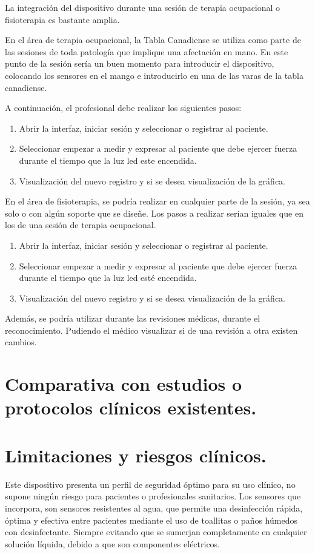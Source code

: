 La integración del dispositivo durante una sesión de terapia ocupacional o fisioterapia es bastante amplia.

En el área de terapia ocupacional, la Tabla Canadiense se utiliza como parte de las sesiones de toda patología que implique una afectación en mano. En este punto de la sesión sería un buen momento para introducir el dispositivo, colocando los sensores en el mango e introducirlo en una de las varas de la tabla canadiense. 

A continuación, el profesional debe realizar los siguientes pasos: 
\begin{enumerate}
    \item Abrir la interfaz, iniciar sesión y seleccionar o registrar al paciente.
    \item Seleccionar empezar a medir y expresar al paciente que debe ejercer fuerza durante el tiempo que la luz led este encendida.
    \item Visualización del nuevo registro y si se desea visualización de la gráfica. 
\end{enumerate}

En el área de fisioterapia, se podría realizar en cualquier parte de la sesión, ya sea solo o con algún soporte que se diseñe. Los pasos a realizar serían iguales que en los de una sesión de terapia ocupacional. 
\begin{enumerate}
    \item Abrir la interfaz, iniciar sesión y seleccionar o registrar al paciente.
    \item Seleccionar empezar a medir y expresar al paciente que debe ejercer fuerza durante el tiempo que la luz led esté encendida.
    \item Visualización del nuevo registro y si se desea visualización de la gráfica. 
\end{enumerate}

Además, se podría utilizar durante las revisiones médicas, durante el reconocimiento. Pudiendo el médico visualizar si de una revisión a otra existen cambios. 

\section{ Comparativa con estudios o protocolos clínicos existentes.}
\section{Limitaciones y riesgos clínicos.}
Este dispositivo presenta un perfil de seguridad óptimo para su uso clínico, no supone ningún riesgo para pacientes o profesionales sanitarios. Los sensores que incorpora, son sensores resistentes al agua, que permite una desinfección rápida, óptima y efectiva entre pacientes mediante el uso de toallitas o paños húmedos con desinfectante. Siempre evitando que se sumerjan completamente en cualquier solución líquida, debido a que son componentes eléctricos.

